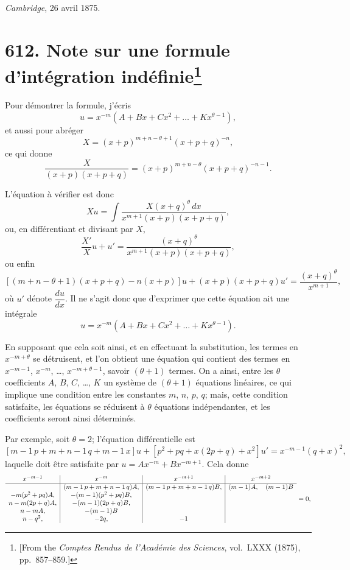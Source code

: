 \documentclass[11pt,a4paper]{book}
\begin{document}
\textit{Cambridge}, 26 avril 1875.
\clearpage


\thispagestyle{empty}


\newpage

\section[Note sur une formule d'int\'{e}gration ind\'{e}finie]{\textbf{612.} Note sur une formule d'int\'{e}gration ind\'{e}finie\footnote{[From the \textit{Comptes Rendus de l'Acad\'{e}mie des Sciences}, vol.~LXXX (1875), pp.~857--859.]}}

Pour d\'{e}montrer la formule, j'\'{e}cris
\[
u = x^{-m}(A + Bx + Cx^2 + \ldots + Kx^{\theta-1}),
\]
et aussi pour abr\'{e}ger
\[
X = (x+p)^{m+n-\theta+1}(x+p+q)^{-n},
\]
ce qui donne
\[
\frac{X}{(x+p)(x+p+q)} = (x+p)^{m+n-\theta}(x+p+q)^{-n-1}.
\]

L'\'{e}quation \`{a} v\'{e}rifier est donc
\[
Xu = \int \frac{X(x+q)^\theta\,dx}{x^{m+1}(x+p)(x+p+q)},
\]
ou, en diff\'{e}rentiant et divisant par $X$,
\[
\frac{X'}{X}u + u' = \frac{(x+q)^\theta}{x^{m+1}(x+p)(x+p+q)},
\]
ou enfin
\[
[(m+n-\theta+1)(x+p+q) - n(x+p)]u + (x+p)(x+p+q)u' = \frac{(x+q)^\theta}{x^{m+1}},
\]
o\`{u} $u'$ d\'{e}note $\dfrac{du}{dx}$. Il ne s'agit donc que d'exprimer que cette \'{e}quation ait une int\'{e}grale
\[
u = x^{-m}(A + Bx + Cx^2 + \ldots + Kx^{\theta-1}).
\]

En supposant que cela soit ainsi, et en effectuant la substitution, les termes en $x^{-m+\theta}$ se d\'{e}truisent, et l'on obtient une \'{e}quation qui contient des termes en $x^{-m-1}$, $x^{-m}$, \ldots, $x^{-m+\theta-1}$, savoir $(\theta+1)$ termes. On a ainsi, entre les $\theta$ coefficients $A$, $B$, $C$, \ldots, $K$ un syst\`{e}me de $(\theta+1)$ \'{e}quations lin\'{e}aires, ce qui implique une condition entre les constantes $m$, $n$, $p$, $q$; mais, cette condition satisfaite, les \'{e}quations se r\'{e}duisent \`{a} $\theta$ \'{e}quations ind\'{e}pendantes, et les coefficients seront ainsi d\'{e}termin\'{e}s.

Par exemple, soit $\theta = 2$; l'\'{e}quation diff\'{e}rentielle est
\[
[m-1\,p + m+n-1\,q + m-1\,x]u + [p^2 + pq + x(2p+q) + x^2]u' = x^{-m-1}(q+x)^2,
\]
laquelle doit \^{e}tre satisfaite par $u = Ax^{-m} + Bx^{-m+1}$. Cela donne
\[
\begin{array}{c|c|c|c}
x^{-m-1} & x^{-m} & x^{-m+1} & x^{-m+2}\\
\hline
& (m-1\,p+m+n-1\,q)A, & (m-1\,p+m+n-1\,q)B, & (m-1)A,\quad (m-1)B\\
-m(p^2+pq)A, & -(m-1)(p^2+pq)B, & \\n-m(2p+q)A, & -(m-1)(2p+q)B, & \\n-mA, & -(m-1)B & \\n-q^2, & -2q, & -1
\end{array} = 0,
\]
\end{document}
